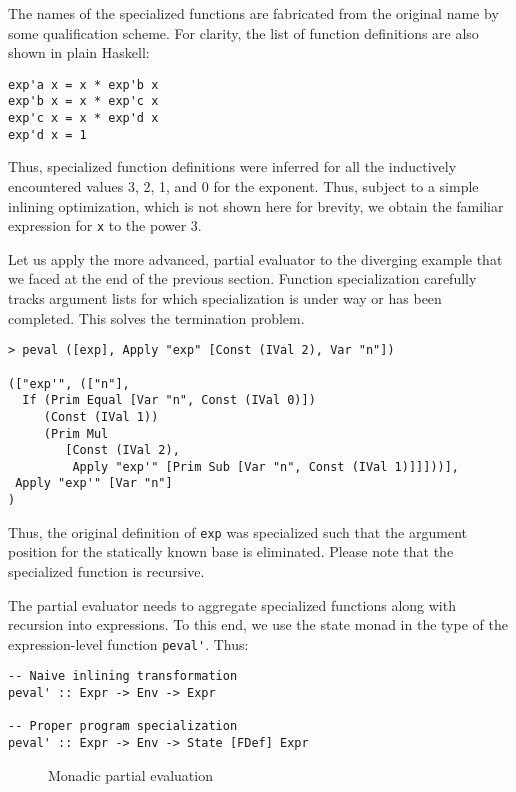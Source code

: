 \documentclass{eptcs}
\begin{document}
\noindent
The names of the specialized functions are fabricated from the
original name by some qualification scheme. For clarity, the list of
function definitions are also shown in plain Haskell:

\begin{lstlisting}
exp'a x = x * exp'b x
exp'b x = x * exp'c x
exp'c x = x * exp'd x
exp'd x = 1
\end{lstlisting}

\noindent
Thus, specialized function definitions were inferred for all the
inductively encountered values 3, 2, 1, and 0 for the exponent. Thus,
subject to a simple inlining optimization, which is not shown here for
brevity, we obtain the familiar expression for \lstinline{x} to the
power 3.

Let us apply the more advanced, partial evaluator to the diverging
example that we faced at the end of the previous section. Function
specialization carefully tracks argument lists for which
specialization is under way or has been completed. This solves
the termination problem.

\begin{lstlisting}
> peval ([exp], Apply "exp" [Const (IVal 2), Var "n"])

(["exp'", (["n"],
  If (Prim Equal [Var "n", Const (IVal 0)])
     (Const (IVal 1))  
     (Prim Mul 
        [Const (IVal 2),
         Apply "exp'" [Prim Sub [Var "n", Const (IVal 1)]]]))],
 Apply "exp'" [Var "n"]
)
\end{lstlisting}

\noindent
Thus, the original definition of \lstinline{exp} was specialized
such that the argument position for the statically known base is
eliminated. Please note that the specialized function is recursive.

The partial evaluator needs to aggregate specialized functions along
with recursion into expressions. To this end, we use the state monad
in the type of the expression-level function \lstinline{peval'}. Thus:

\begin{lstlisting}
-- Naive inlining transformation
peval' :: Expr -> Env -> Expr

-- Proper program specialization
peval' :: Expr -> Env -> State [FDef] Expr
\end{lstlisting}

\begin{figure}
   \caption{Monadic partial evaluation}
\label{F:State}
\bigskip
\end{figure}
\end{document}

